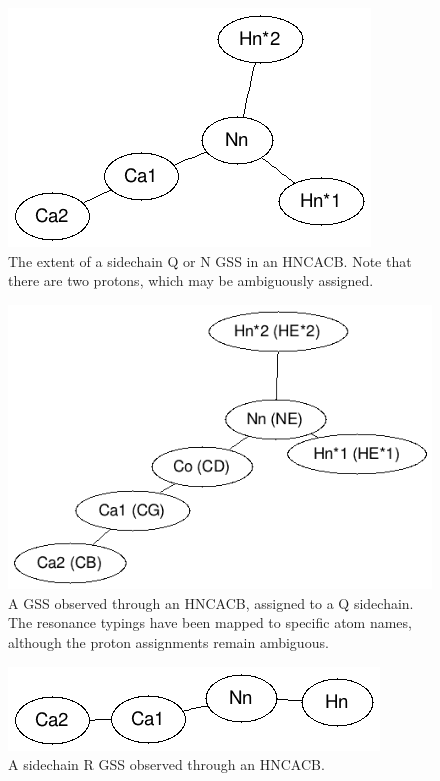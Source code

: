 \begin{figure}
  \includegraphics[scale=0.75]{figures/sidechain_qn_hncacb}
  \caption[The extent of a sidechain Q or N GSS in an HNCACB.]
          {The extent of a sidechain Q or N GSS in an HNCACB.  Note that
           there are two protons, which may be ambiguously assigned.}
  \label{sidechain_qn_hncacb}
\end{figure}

\begin{figure}
  \includegraphics[scale=0.75]{figures/sidechain_q_hncacb}
  \caption[A GSS observed through an HNCACB, assigned to a Q sidechain.]
          {A GSS observed through an HNCACB, assigned to a Q sidechain.
           The resonance typings have been mapped to specific atom names,
           although the proton assignments remain ambiguous.}
  \label{sidechain_q_hncacb}
\end{figure}

\begin{figure}
  \includegraphics[scale=0.75]{figures/sidechain_r_hncacb}
  \caption{A sidechain R GSS observed through an HNCACB.}
  \label{sidechain_r_hncacb}
\end{figure}

